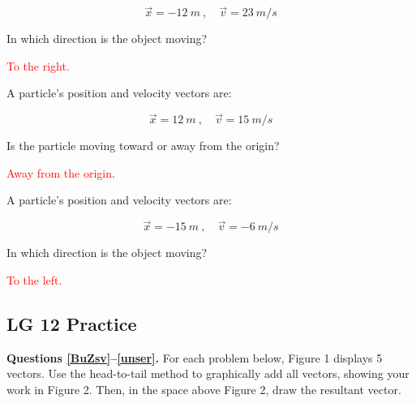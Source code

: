 \documentclass[]{exam}
\begin{document}
\begin{questions}
\begin{equation*}
    \vec{x} = -\SI{12}{m}\ , \quad \vec{v} = \SI{23}{m/s}
\end{equation*}

In which direction is the object moving?

\ifprintanswers \textcolor{red}{To the right.} \fi


\question %
A particle's position and velocity vectors are:

\begin{equation*}
    \vec{x} = \SI{12}{m}\ , \quad \vec{v} = \SI{15}{m/s}    
\end{equation*}


Is the particle moving toward or away from the origin?

\ifprintanswers \textcolor{red}{Away from the origin}. \fi


\question \label{Yi2yY}
A particle's position and velocity vectors are:

\begin{equation*}
    \vec{x} = -\SI{15}{m}\ , \quad \vec{v} = -\SI{6}{m/s} 
\end{equation*}


In which direction is the object moving?

\ifprintanswers \textcolor{red}{To the left.} \fi


\end{questions}

\clearpage

\subsection*{LG 12 Practice}

\textbf{Questions \ref{BuZsv}--\ref{unser}.} 
For each problem below, Figure 1 displays 5 vectors. Use the head-to-tail method to graphically add all vectors, showing your work in Figure 2. Then, in the space above Figure 2, draw the resultant vector.
\end{document}
